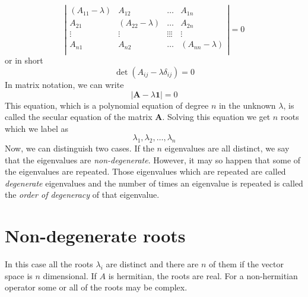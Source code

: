 \begin{equation}
	\left|
	\begin{matrix}
		(A_{11}-\lambda) & A_{12} & \ldots & A_{1n} \\
		A_{21} & (A_{22}-\lambda) & \ldots & A_{2n} \\
		\vdots & \vdots & \vdots \vdots \vdots & \vdots \\
		A_{n1} & A_{n2} & \ldots & (A_{nn}-\lambda) \\
	\end{matrix}
	\right| = 0
\end{equation}
	or in short
	\begin{equation}
		\det(A_{ij} - \lambda \delta_{ij}) = 0
	\end{equation}
	In matrix notation, we can write
	\begin{equation}
		\left|\mathbf{A} - \lambda \mathbf{1} \right| = 0
	\end{equation}
	This equation, which is a polynomial equation of degree $n$ in the unknown $\lambda$, is called the secular equation of the matrix $\mathbf{A}$. Solving this equation we get $n$ roots which we label as 
	\begin{equation}
		\lambda_1, \lambda_2, \ldots, \lambda_n \nonumber
	\end{equation}
	Now, we can distinguish two cases. If the $n$ eigenvalues are all distinct, we say that the eigenvalues are \textit{non-degenerate}. However, it may so happen that some of the eigenvalues are repeated. Those eigenvalues which are repeated are called \textit{degenerate}
	eigenvalues and the number of times an eigenvalue is repeated is called the \textit{order of degeneracy} of that eigenvalue.
	
	\section{Non-degenerate roots}
	In this case all the roots $\lambda_i$ are distinct and there are $n$ of them if the vector space is $n$ dimensional. If $A$ is hermitian, the roots are real. For a non-hermitian operator some or all of the roots may be complex.\\
	

